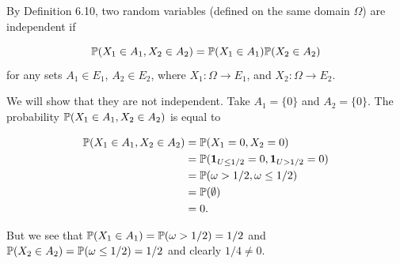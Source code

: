 
By Definition 6.10, two random variables (defined on the same domain $ \Omega$) are independent if

\[
    \P(X_1 \in A_1, X_2 \in A_2) = \P(X_1\in A_1) \P(X_2 \in A_2)
\] 
for any sets $ A_1 \in E_1$, $ A_2 \in E_2$, where $ X_1: \Omega \to E_1$, and $ X_2: \Omega \to
E_2$.

We will show that they are not independent. Take $ A_1 = \{ 0 \} $ and $ A_2 = \{ 0 \} $. The
probability $ \P(X_1 \in A_1, X_2 \in A_2)$ is equal to

\begin{align*}
    \P(X_1 \in A_1, X_2 \in A_2) &= \P( X_1= 0, X_2 = 0)\\
				 &= \P( \1_{U \leq 1/2} = 0, \1_{U > 1/2} = 0)\\
				 &= \P(\omega > 1/2, \omega \leq 1/2)\\
				 &= \P(\emptyset)\\
				 &= 0.
\end{align*}

But we see that $ \P(X_1 \in A_1) = \P(\omega > 1/2)= 1/2$ and $ \P(X_2 \in A_2) = \P(\omega \leq
1/2) = 1/2$ and clearly $ 1/4 \neq 0$.
